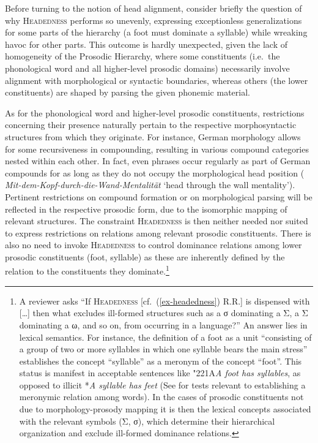 \documentclass[output=paper
 ,nobabel
 ,draftmode
 ,colorlinks, citecolor=brown
]{langscibook}
\begin{document}
Before turning to the notion of head alignment, consider briefly the question of why \textsc{Headedness} performs so unevenly, expressing exceptionless generalizations for some parts of the hierarchy (\eg a foot must dominate a syllable) while wreaking havoc for other parts. This outcome is hardly unexpected, given the lack of homogeneity of the Prosodic Hierarchy, where some constituents (i.e.\ the phonological word and all higher-level prosodic domains) necessarily involve alignment with morphological or syntactic boundaries, whereas others (the lower constituents) are shaped by parsing the given phonemic material. 

As for the phonological word and higher-level prosodic constituents, restrictions concerning their
presence naturally pertain to the respective morphosyntactic structures from which they
originate. For instance, German morphology allows for some recursiveness in compounding, resulting
in various compound categories nested within each other. In fact, even phrases occur regularly as
part of German compounds for as long as they do not occupy the morphological head position (\eg
\emph{Mit-dem-Kopf-durch-die-Wand-Mentalität} `head through the wall mentality'). Pertinent
restrictions on compound formation or on morphological parsing will be reflected in the respective
prosodic form, due to the isomorphic mapping of relevant structures. The constraint
\textsc{Headedness} is then neither needed nor suited to express restrictions on relations among relevant
prosodic constituents. There is also no need to invoke \textsc{Headedness} to control dominance
relations among lower prosodic constituents (foot, syllable) as these are inherently defined by the
relation to the constituents they dominate.\footnote{A reviewer asks ``If \textsc{Headedness} [cf.\
  (\ref{ex-headedness}) R.R.] is dispensed with [\dots] then what excludes ill-formed structures
  such as a σ dominating a Σ, a Σ dominating a ω, and so on, from occurring in a language?'' 
An answer lies in lexical semantics. For instance, the definition of a foot as a unit ``consisting
of a group of two or more syllables in which one syllable bears the main stress''
\citep[147]{Trask1996} establishes the concept ``syllable'' as a meronym of the concept
``foot''. This status is manifest in acceptable sentences like \char"221A\emph{A foot has
  syllables}, as opposed to illicit *\emph{A syllable has feet} (See
\citealp[157--180]{cruse:1986:lexical:semantics} for tests relevant to establishing a meronymic relation among words). In the cases of prosodic constituents not due to morphology-prosody mapping it is then the lexical concepts associated with the relevant symbols (\eg Σ, σ), which determine their hierarchical organization and exclude ill-formed dominance relations.}
\end{document}
